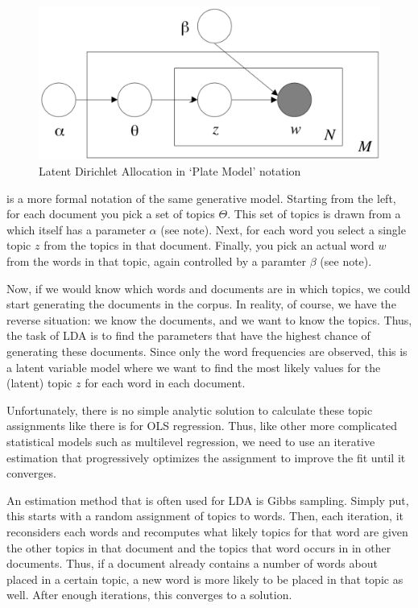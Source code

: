 \begin{figure}
  \includegraphics[width=\linewidth]{chapter12/lda.png}
  \caption{Latent Dirichlet Allocation in `Plate Model' notation \citep[fig. 1]{blei03}}\label{fig:lda}
\end{figure}

 is a more formal notation of the same generative model.
Starting from the left, for each document you pick a set of topics $\Theta$.
This set of topics is drawn from a  which itself has a parameter $\alpha$
(see note).
Next, for each word you select a single topic $z$ from the topics in that document.
Finally, you pick an actual word $w$ from the words in that topic, again controlled by a paramter $\beta$ (see note).

Now, if we would know which words and documents are in which topics, we could start generating the documents in the corpus.
In reality, of course, we have the reverse situation:
we know the documents, and we want to know the topics.
Thus, the task of LDA is to find the parameters that have the highest chance of generating these documents.
Since only the word frequencies are observed, this is a latent variable model where we want to find the
most likely values for the (latent) topic $z$ for each word in each document. 

Unfortunately, there is no simple analytic solution to calculate these topic assignments
like there is for OLS regression.
Thus, like other more complicated statistical models such as multilevel regression,
we need to use an iterative estimation that progressively optimizes the assignment to improve the fit until it converges.

An estimation method that is often used for LDA is Gibbs sampling.
Simply put, this starts with a random assignment of topics to words.
Then, each iteration, it reconsiders each words and recomputes what likely topics for that word are
given the other topics in that document and the topics that word occurs in in other documents.
Thus, if a document already contains a number of words about placed in a certain topic,
a new word is more likely to be placed in that topic as well.
After enough iterations, this converges to a solution. 

